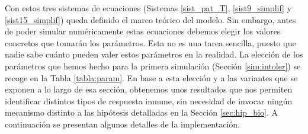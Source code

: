 Con estos tres sistemas de ecuaciones (Sistemas \ref{sist_pat_T}, \ref{sist9_simplif} y \ref{sist15_simplif}) queda definido el marco teórico del modelo. Sin embargo, antes de poder simular numéricamente estas ecuaciones debemos elegir los valores concretos que tomarán los parámetros. Esta no es una tarea sencilla, puesto que nadie sabe cuánto pueden valer estos parámetros en la realidad. La elección de los parámetros que hemos hecho para la primera simulación (Sección \ref{sim:intoler}) se recoge en la Tabla \ref{tabla:param}. En base a esta elección y a las variantes que se exponen a lo largo de esa sección, obtenemos unos resultados que nos permiten identificar distintos tipos de respuesta inmune, sin necesidad de invocar ningún mecanismo distinto a las hipótesis detalladas en la Sección \ref{sec:hip_bio}. A continuación se presentan algunos detalles de la implementación.

